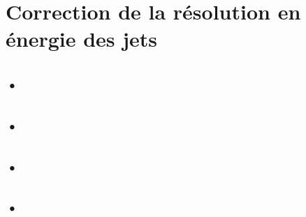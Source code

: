 \section{Correction de la résolution en énergie des jets}

\subsection{•}
\subsection{•}
\subsection{•}
\subsection{•}
